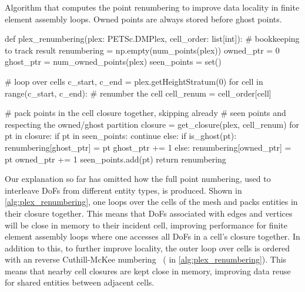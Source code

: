 \documentclass[thesis]{subfiles}
\begin{document}
\begin{algorithm}
  \caption{
    Algorithm that computes the point renumbering to improve data locality in finite element assembly loops.
    Owned points are always stored before ghost points.
  }

  \begin{center}
    \begin{minipage}{.9\textwidth}
      \begin{pyalg2}
        def plex_renumbering(plex: PETSc.DMPlex, cell_order: list[int]):
          # bookkeeping to track result
          renumbering = np.empty(num_points(plex))
          owned_ptr = 0
          ghost_ptr = num_owned_points(plex)
          seen_points = set()

          # loop over cells
          c_start, c_end = plex.getHeightStratum(0)
          for cell in range(c_start, c_end):
            # renumber the cell
            cell_renum = cell_order[cell]

            # pack points in the cell closure together, skipping already
            # seen points and respecting the owned/ghost partition
            closure = get_closure(plex, cell_renum)
            for pt in closure:
              if pt in seen_points:
                continue
              else:
                if is_ghost(pt):
                  renumbering[ghost_ptr] = pt
                  ghost_ptr += 1
                else:
                  renumbering[owned_ptr] = pt
                  owned_ptr += 1
                seen_points.add(pt)
        return renumbering
      \end{pyalg2}
    \end{minipage}
  \end{center}
  \label{alg:plex_renumbering}
\end{algorithm}

Our explanation so far has omitted how the full point numbering, used to interleave DoFs from different entity types, is produced.
Shown in \cref{alg:plex_renumbering}, one loops over the cells of the mesh and packs entities in their closure together.
This means that DoFs associated with edges and vertices will be close in memory to their incident cell, improving performance for finite element assembly loops where one accesses all DoFs in a cell's closure together.
In addition to this, to further improve locality, the outer loop over cells is ordered with an reverse Cuthill-McKee numbering~\cite{cuthillReducingBandwidthSparse1969} ( in \cref{alg:plex_renumbering}).
This means that nearby cell closures are kept close in memory, improving data reuse for shared entities between adjacent cells.
\end{document}
